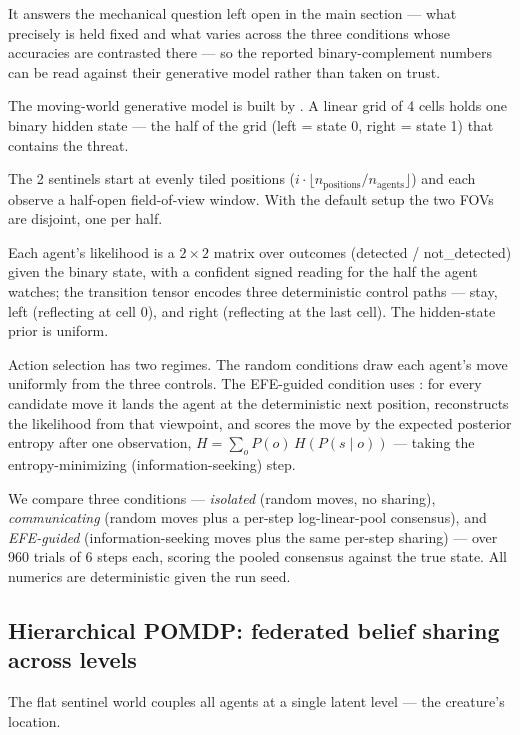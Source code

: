 \documentclass[
  english,
]{article}
\theoremstyle{plain}
\theoremstyle{definition}
\theoremstyle{remark}
\theoremstyle{definition}
\begin{document}
It answers the mechanical question left open in the main section ---
what precisely is held fixed and what varies across the three conditions
whose accuracies are contrasted there --- so the reported
binary-complement numbers can be read against their generative model
rather than taken on trust.

The moving-world generative model is built by
. A linear grid of 4 cells holds one binary
hidden state --- the half of the grid (left = state 0, right = state 1)
that contains the threat.

The 2 sentinels start at evenly tiled positions
(\(i \cdot \lfloor n_{\text{positions}} / n_{\text{agents}} \rfloor\))
and each observe a half-open field-of-view window. With the default
setup the two FOVs are disjoint, one per half.

Each agent's likelihood is a \(2 \times 2\) matrix over outcomes
(detected / not\_detected) given the binary state, with a confident
signed reading for the half the agent watches; the transition tensor
encodes three deterministic control paths --- stay, left (reflecting at
cell 0), and right (reflecting at the last cell). The hidden-state prior
is uniform.

Action selection has two regimes. The random conditions draw each
agent's move uniformly from the three controls. The EFE-guided condition
uses : for every candidate move it lands the
agent at the deterministic next position, reconstructs the likelihood
from that viewpoint, and scores the move by the expected posterior
entropy after one observation, \(H = \sum_o P(o)\,H(P(s \mid o))\) ---
taking the entropy-minimizing (information-seeking) step.

We compare three conditions --- \emph{isolated} (random moves, no
sharing), \emph{communicating} (random moves plus a per-step
log-linear-pool consensus), and \emph{EFE-guided} (information-seeking
moves plus the same per-step sharing) --- over 960 trials of 6 steps
each, scoring the pooled consensus against the true state. All numerics
are deterministic given the run seed.

\subsection{Hierarchical POMDP: federated belief sharing across
levels}\label{sec:results-hierarchical}

The flat sentinel world couples all agents at a single latent level ---
the creature's location.
\end{document}
